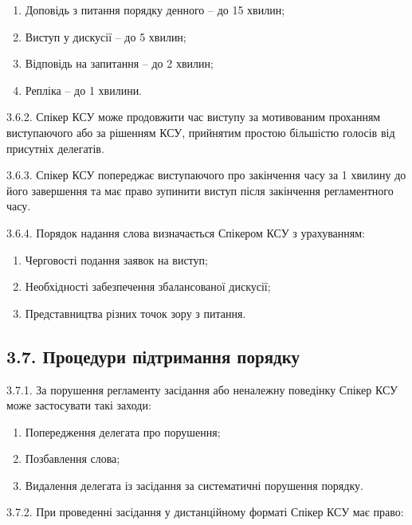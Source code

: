         \begin{enumerate}[label=\alph*)]
            \item Доповідь з питання порядку денного -- до 15 хвилин;
            \item Виступ у дискусії -- до 5 хвилин;
            \item Відповідь на запитання -- до 2 хвилин;
            \item Репліка -- до 1 хвилини.
        \end{enumerate}

    3.6.2. Спікер КСУ може продовжити час виступу за мотивованим проханням виступаючого або за рішенням КСУ, прийнятим простою більшістю голосів від присутніх делегатів.

    3.6.3. Спікер КСУ попереджає виступаючого про закінчення часу за 1 хвилину до його завершення та має право зупинити виступ після закінчення регламентного часу.

    3.6.4. Порядок надання слова визначається Спікером КСУ з урахуванням:

        \begin{enumerate}[label=\alph*)]
            \item Черговості подання заявок на виступ;
            \item Необхідності забезпечення збалансованої дискусії;
            \item Представництва різних точок зору з питання.
        \end{enumerate}

\subsection*{3.7. Процедури підтримання порядку}
    3.7.1. За порушення регламенту засідання або неналежну поведінку Спікер КСУ може застосувати такі заходи:

        \begin{enumerate}[label=\alph*)]
            \item Попередження делегата про порушення;
            \item Позбавлення слова;
            \item Видалення делегата із засідання за систематичні порушення порядку.
        \end{enumerate}

    3.7.2. При проведенні засідання у дистанційному форматі Спікер КСУ має право:

